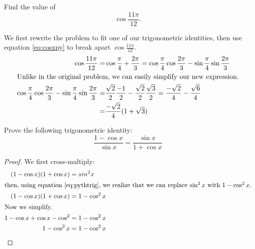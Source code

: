 \begin{ex}
  Find the value of
  \[ \cos{\frac{11 \pi}{12}} \text{.}\]
  \begin{sol}
    We first rewrite the problem to fit one of our trigonometric identities,
    then use equation \eqref{eq:cosxpy} to break apart \(\cos{\frac{11 \pi}{12}}\).
    \begin{align*}
      \cos{\frac{11 \pi}{12}}
      =&\cos{\frac{\pi}{4}+\frac{2 \pi}{3}}
      =\cos{\frac{\pi}{4}} \cos{\frac{2\pi}{3}}
        -\sin\frac{\pi}{4} \sin\frac{2\pi}{3} \\
      \intertext{Unlike in the original problem, we can easily simplify our new expression.}
      \cos{\frac{\pi}{4}} \cos{\frac{2\pi}{3}}
        - \sin{\frac{\pi}{4}} \sin{\frac{2\pi}{3}}
      =& \frac{\sqrt 2}{2} \frac{-1}{2}
        -\frac{\sqrt 2}{2} \frac{\sqrt 3}{2}
      =\frac{-\sqrt 2}{4}
        - \frac{\sqrt{6}}{4} \\
      = &\frac{-\sqrt 2}{4}(1+\sqrt 3)
    \end{align*}
  \end{sol}
\end{ex}
\begin{ex}
  Prove the following trigonometric identity:
  \[ \frac{1-\cos x}{\sin x}=\frac{\sin x}{1+\cos x} \]
  \begin{proof}
    We first cross-multiply:
    \begin{align*}
      \ (1-\cos x)(1+\cos x) &= sin^2 x \\
      \intertext{then, using equation \eqref{eq:pythtrig}, we realize that we can replace \(\sin^2 x\) with \(1-\cos^2 x\).}
       (1-\cos x)(1+\cos x) &= 1-\cos^2x\\
      \intertext{Now we simplify.}
      1-\cos x + \cos x -\cos^2 &= 1-\cos^2x \\
      1-\cos^2x &= 1-\cos^2x \qedhere
    \end{align*}
  \end{proof}
\end{ex}


